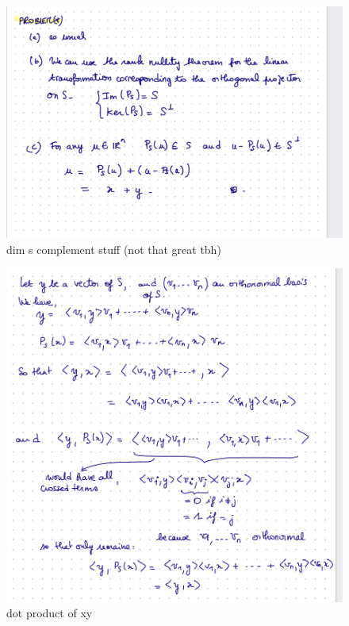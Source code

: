 \documentclass[12pt,twoside]{article}
\begin{document}
\begin{figure}[h]
    \centering
    \includegraphics[scale=.45]{screenshots/dim s complement stuff (not that great tbh).png}
    \caption{dim s complement stuff (not that great tbh)}
    \label{fig:my_label}
\end{figure}

\begin{figure}[h]
    \centering
    \includegraphics[scale=.45]{screenshots/dot of xy equals dot of projection x dot y.png}
    \caption{dot product of xy}
    \label{fig:my_label}
\end{figure}
\end{document}
